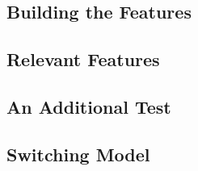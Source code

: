 \documentclass[12pt]{article} %
\numberwithin{equation}{subsection}
\begin{document}
\subsection{Building the Features}




\subsection{Relevant Features}




\subsection{An Additional Test}



\subsection{Switching Model}
\end{document}
